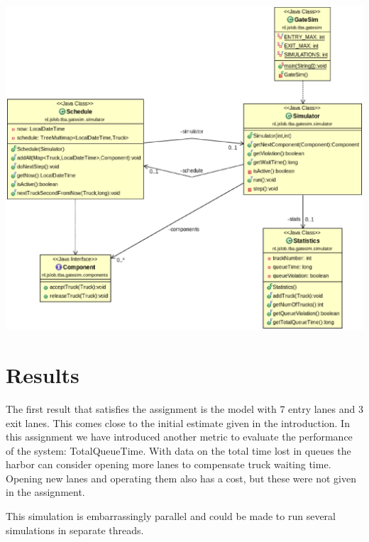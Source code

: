 \documentclass{article}
\begin{document}
\includegraphics[scale=0.4]{Simulator.eps}

\section{Results}

The first result that satisfies the assignment is the model with 7
entry lanes and 3 exit lanes. This comes close to the initial estimate
given in the introduction. In this assignment we have introduced
another metric to evaluate the performance of the system:
TotalQueueTime. With data on the total time lost in queues the harbor
can consider opening more lanes to compensate truck waiting
time. Opening new lanes and operating them also has a cost, but these
were not given in the assignment.

This simulation is embarrassingly parallel and could be made to run
several simulations in separate threads.
\end{document}
